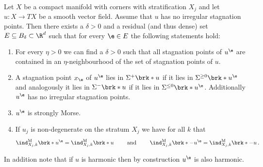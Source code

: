 \begin{corollary}\label{co:density_boundaryGeneric}
  Let $X$ be a compact manifold with corners with stratification $X_j$ and let $u\colon X\to TX$ be a smooth vector field.
  Assume that $u$ has no irregular stagnation points.
  Then there exists a $\delta>0$ and a residual (and thus dense) set $E\subseteq B_\delta\subset\R^d$ such that for every $\e\in E$
  the following statements hold:
  \begin{enumerate}
    \item For every $\eta>0$ we can find a $\delta>0$ such that all stagnation points of $u^\e$ are contained in an 
    $\eta$-neighbourhood of the set of stagnation points of $u$.\label{co:nonDegeneracy_density_etaNbh}
    \item A stagnation point $x_\e$ of $u^\e$ lies in $\Sigma^+\brk*{u}$ if it lies in $\Sigma^{\geq0}\brk*{u^\e}$ 
      and analogously it lies in $\Sigma^-\brk*{u}$ if it lies in $\Sigma^{\leq0}\brk*{u^\e}$. Additionally $u^\e$ has no
      irregular stagnation points.
      \label{co:nonDegeneracy_density_entrEmerg}
    \item $u^\e$ is strongly Morse. \label{co:nonDegeneracy_density_nonDeg}
    \item If $u_j$ is non-degenerate on the stratum $X_j$ we have\label{co:nonDegeneracy_density_index}
    for all $k$ that
    \begin{align*}
      \ind^\text{M}_{X_j,k}\brk*{u^\e}=\ind^\text{M}_{X_j,k}\brk*{u}\qquad\text{ and }\qquad\ind^\text{M}_{X_j,k}\brk*{-u^\e}=\ind^\text{M}_{X_j,k}\brk*{-u}\,.
    \end{align*}
  \end{enumerate}
  In addition note that if $u$ is harmonic then by construction $u^\e$ is also harmonic.
\end{corollary}
